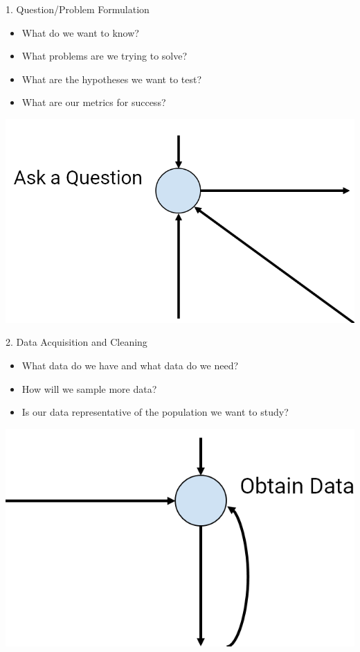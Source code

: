 \documentclass[aspectratio=169]{../latex_main/tntbeamer}  %
\begin{document}
    \begin{frame}{1. Question/Problem Formulation}
        \begin{itemize}
            \item What do we want to know?
            \item What problems are we trying to solve?
            \item What are the hypotheses we want to test?
            \item What are our metrics for success?
        \end{itemize}
    \hfill
    \includegraphics[scale=.45]{bild17}
    \end{frame}

    \begin{frame}{2. Data Acquisition and Cleaning}
        \begin{itemize}
            \item What data do we have and what data do we need?
            \item How will we sample more data?
            \item Is our data representative of the population we want to study?
        \end{itemize}
        \includegraphics[scale=.45]{bild18}
        
    \end{frame}
\end{document}
